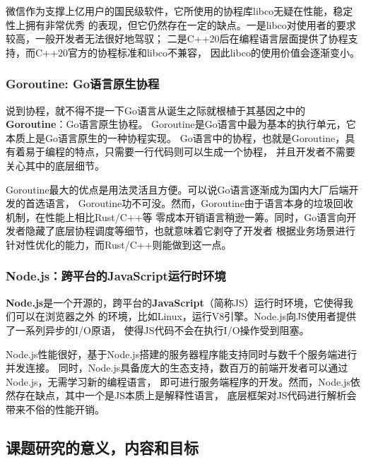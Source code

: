 \documentclass[supercite]{HustGraduPaper}
\theoremstyle{definition}
\begin{document}
微信\cite{montag2018multipurpose}作为支撑上亿用户的国民级软件，它所使用的协程库libco无疑在性能，稳定性上拥有非常优秀
的表现，但它仍然存在一定的缺点。一是libco对使用者的要求较高，一般开发者无法很好地驾驭；
二是C++20后在编程语言层面提供了协程支持\cite{belson2020c++}，而C++20官方的协程标准和libco不兼容，
因此libco的使用价值会逐渐变小。\par

\subsubsection{Goroutine: Go语言原生协程}
说到协程，就不得不提一下Go语言\cite{meyerson2014go}从诞生之际就根植于其基因之中的\textbf{Goroutine}：Go语言原生协程\cite{prabhakar2011concurrent}。
Goroutine是Go语言中最为基本的执行单元，它本质上是Go语言原生的一种协程实现。
Go语言中的协程，也就是Goroutine，具有着易于编程的特点，只需要一行代码则可以生成一个协程，
并且开发者不需要关心其中的底层细节。\par

Goroutine最大的优点是用法灵活且方便。可以说Go语言逐渐成为国内大厂后端开发的首选语言，
Goroutine功不可没。然而，Goroutine由于语言本身的垃圾回收机制\cite{sibiryov2017golang}，在性能上相比Rust/C++等
零成本开销语言稍逊一筹\cite{keskiniemi2022measuring}。同时，Go语言向开发者隐藏了底层协程调度等细节，也就意味着它剥夺了开发者
根据业务场景进行针对性优化的能力，而Rust/C++则能做到这一点。\par

\subsubsection{Node.js：跨平台的JavaScript运行时环境}
\textbf{Node.js}\cite{tilkov2010node}是一个开源的，跨平台的\textbf{JavaScript}\cite{crockford2008javascript}（简称JS）运行时环境，它使得我们可以在浏览器之外
的环境，比如Linux，运行V8引擎。Node.js向JS使用者提供了一系列异步的I/O原语，
使得JS代码不会在执行I/O操作受到阻塞。\par

Node.js性能很好，基于Node.js搭建的服务器程序能支持同时与数千个服务端进行并发连接。
同时，Node.js具备庞大的生态支持，数百万的前端开发者可以通过Node.js，无需学习新的编程语言，
即可进行服务端程序的开发。然而，Node.js依然存在缺点，其中一个是JS本质上是解释性语言，
底层框架对JS代码进行解析会带来不俗的性能开销。\par

\subsection{课题研究的意义，内容和目标}
\end{document}
